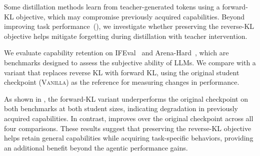 \begin{table}[ht]
    \centering
    \small
    \caption{Impact of preserving the reverse-KL objective on mitigating forgetting.}
    \label{tab:reverse_kl_forgetting}
    \vspace{-1.0em}
\end{table}




Some distillation methods learn from teacher-generated tokens using a forward-KL objective, which may compromise previously acquired capabilities.
Beyond improving task performance~(), we investigate whether preserving the reverse-KL objective helps mitigate forgetting during distillation with teacher intervention.

We evaluate capability retention on IFEval~\citep{abs-2311-07911} and Arena-Hard~\citep{arenahard2024}, which are benchmarks designed to assess the subjective ability of LLMs.
We compare \name with a variant that replaces reverse KL with forward KL, using the original student checkpoint (\textsc{Vanilla}) as the reference for measuring changes in performance.

As shown in , the forward-KL variant underperforms the original checkpoint on both benchmarks at both student sizes, indicating degradation in previously acquired capabilities.
In contrast, \name improves over the original checkpoint across all four comparisons.
These results suggest that preserving the reverse-KL objective helps retain general capabilities while acquiring task-specific behaviors, providing an additional benefit beyond the agentic performance gains.

